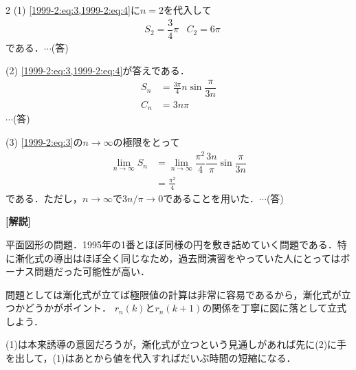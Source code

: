\documentclass[../../main.tex]{subfiles}
\begin{document}
\begin{multicols}{2}
  \vspace{10pt}
  (1)
  \cref{1999-2:eq:3,1999-2:eq:4}に$n=2$を代入して
  \begin{align*}
     & S_2 = \dfrac{3}{4}\pi & C_2 = 6\pi
  \end{align*}
  である．$\cdots$(答)

  \vspace{10pt}
  (2)
  \cref{1999-2:eq:3,1999-2:eq:4}が答えである．
  \begin{align*}
    S_n & = \frac{3\pi}{4} n \sin \dfrac{\pi}{3n} \\
    C_n & = 3n\pi
  \end{align*}$\cdots$(答)

  \vspace{10pt}
  (3)
  \cref{1999-2:eq:3}の$n\to\infty$の極限をとって
  \begin{align*}
    \lim_{n\to\infty} S_n
     & = \lim_{n\to\infty} \dfrac{\pi^2}{4} \dfrac{3n}{\pi} \sin \dfrac{\pi}{3n} \\
     & = \frac{\pi^2}{4}
  \end{align*}
  である．ただし，$n\to\infty$で$3n/\pi\to 0$であることを用いた．$\cdots$(答)

  \vspace{10pt}
  {\bf[解説]}

  平面図形の問題．1995年の1番とほぼ同様の円を敷き詰めていく問題である．特に漸化式の導出はほぼ全く同じなため，過去問演習をやっていた人にとってはボーナス問題だった可能性が高い．

  問題としては漸化式が立てば極限値の計算は非常に容易であるから，漸化式が立つかどうかがポイント．
  $r_n(k)$と$r_n(k+1)$の関係を丁寧に図に落として立式しよう．

  (1)は本来誘導の意図だろうが，漸化式が立つという見通しがあれば先に(2)に手を出して，(1)はあとから値を代入すればだいぶ時間の短縮になる．

  \newpage
\end{multicols}
\end{document}
